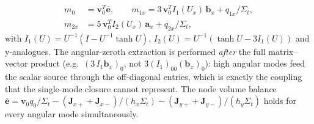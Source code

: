 \documentclass[11pt,a4paper]{article}
\begin{document}
\begin{align}
m_0 &= \mathbf{v}_0^T\overline{\mathbf{e}}, \qquad
m_{1x} = 3\,\mathbf{v}_0^T I_1(U_x)\,\mathbf{b}_x + q_{1x}/\Sigma_t,\\
m_{2x} &= 5\,\mathbf{v}_0^T I_2(U_x)\,\mathbf{a}_x + q_{2x}/\Sigma_t,
\end{align}
with $I_1(U)=U^{-1}(I-U^{-1}\tanh U)$, $I_2(U)=U^{-1}(\tanh U-3I_1(U))$
and y-analogues. The angular-zeroth extraction is performed
\emph{after} the full matrix--vector product (e.g.\
$(3\,I_1\mathbf{b}_x)_0$, not $3(I_1)_{00}(\mathbf{b}_x)_0$): high
angular modes feed the scalar source through the off-diagonal entries,
which is exactly the coupling that the single-mode closure cannot
represent. The node volume balance
$\overline{\mathbf{e}}=\mathbf{v}_0 q_0/\Sigma_t
-(\mathbf{J}_{x+}+\mathbf{J}_{x-})/(h_x\Sigma_t)
-(\mathbf{J}_{y+}+\mathbf{J}_{y-})/(h_y\Sigma_t)$ holds for every
angular mode simultaneously.
\end{document}

